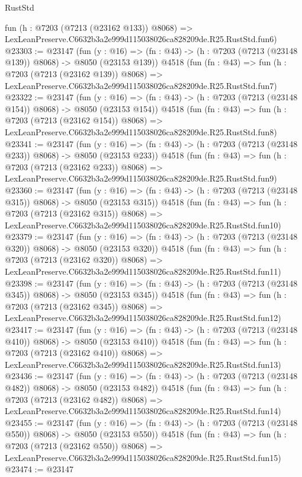 \begin{lexlean}{RustStd}
\begin{coremodule}
    fun (h : @7203 (@7213 (@23162 @133)) @8068) =>
    LexLeanPreserve.C6632b3a2e999d115038026ca828209de.R25.RustStd.fun6)
@23303 := @23147
    (fun (y : @16) => (fn : @43) -> (h : @7203 (@7213 (@23148 @139)) @8068) -> @8050 (@23153 @139))
    @4518
    (fun (fn : @43) =>
    fun (h : @7203 (@7213 (@23162 @139)) @8068) =>
    LexLeanPreserve.C6632b3a2e999d115038026ca828209de.R25.RustStd.fun7)
@23322 := @23147
    (fun (y : @16) => (fn : @43) -> (h : @7203 (@7213 (@23148 @154)) @8068) -> @8050 (@23153 @154))
    @4518
    (fun (fn : @43) =>
    fun (h : @7203 (@7213 (@23162 @154)) @8068) =>
    LexLeanPreserve.C6632b3a2e999d115038026ca828209de.R25.RustStd.fun8)
@23341 := @23147
    (fun (y : @16) => (fn : @43) -> (h : @7203 (@7213 (@23148 @233)) @8068) -> @8050 (@23153 @233))
    @4518
    (fun (fn : @43) =>
    fun (h : @7203 (@7213 (@23162 @233)) @8068) =>
    LexLeanPreserve.C6632b3a2e999d115038026ca828209de.R25.RustStd.fun9)
@23360 := @23147
    (fun (y : @16) => (fn : @43) -> (h : @7203 (@7213 (@23148 @315)) @8068) -> @8050 (@23153 @315))
    @4518
    (fun (fn : @43) =>
    fun (h : @7203 (@7213 (@23162 @315)) @8068) =>
    LexLeanPreserve.C6632b3a2e999d115038026ca828209de.R25.RustStd.fun10)
@23379 := @23147
    (fun (y : @16) => (fn : @43) -> (h : @7203 (@7213 (@23148 @320)) @8068) -> @8050 (@23153 @320))
    @4518
    (fun (fn : @43) =>
    fun (h : @7203 (@7213 (@23162 @320)) @8068) =>
    LexLeanPreserve.C6632b3a2e999d115038026ca828209de.R25.RustStd.fun11)
@23398 := @23147
    (fun (y : @16) => (fn : @43) -> (h : @7203 (@7213 (@23148 @345)) @8068) -> @8050 (@23153 @345))
    @4518
    (fun (fn : @43) =>
    fun (h : @7203 (@7213 (@23162 @345)) @8068) =>
    LexLeanPreserve.C6632b3a2e999d115038026ca828209de.R25.RustStd.fun12)
@23417 := @23147
    (fun (y : @16) => (fn : @43) -> (h : @7203 (@7213 (@23148 @410)) @8068) -> @8050 (@23153 @410))
    @4518
    (fun (fn : @43) =>
    fun (h : @7203 (@7213 (@23162 @410)) @8068) =>
    LexLeanPreserve.C6632b3a2e999d115038026ca828209de.R25.RustStd.fun13)
@23436 := @23147
    (fun (y : @16) => (fn : @43) -> (h : @7203 (@7213 (@23148 @482)) @8068) -> @8050 (@23153 @482))
    @4518
    (fun (fn : @43) =>
    fun (h : @7203 (@7213 (@23162 @482)) @8068) =>
    LexLeanPreserve.C6632b3a2e999d115038026ca828209de.R25.RustStd.fun14)
@23455 := @23147
    (fun (y : @16) => (fn : @43) -> (h : @7203 (@7213 (@23148 @550)) @8068) -> @8050 (@23153 @550))
    @4518
    (fun (fn : @43) =>
    fun (h : @7203 (@7213 (@23162 @550)) @8068) =>
    LexLeanPreserve.C6632b3a2e999d115038026ca828209de.R25.RustStd.fun15)
@23474 := @23147

\end{coremodule}
\end{lexlean}
